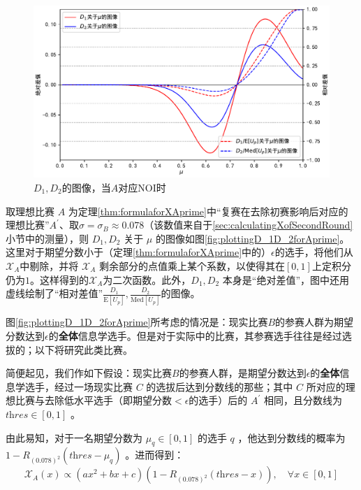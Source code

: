             \begin{figure}[htbp]
                \centering
                \includegraphics[width=\textwidth]{fig/plottingNoiD_1D_2.pdf}
                \caption{$D_1,D_2$的图像，当$A$对应NOI时}
                \label{fig:plottingD_1D_2forNoi}
            \end{figure}

            取理想比赛 $A$ 为定理\ref{thm:formulaforXAprime}中“复赛在去除初赛影响后对应的理想比赛”$A^\prime$、取$\sigma=\sigma_B\approx 0.078$（该数值来自于\ref{sec:calculatingXofSecondRound}小节中的测量），则 $D_1,D_2$ 关于 $\mu$ 的图像如图\ref{fig:plottingD_1D_2forAprime}。这里对于期望分数小于（定理\ref{thm:formulaforXAprime}中的）$\epsilon$的选手，将他们从$\mathcal{X}_A$中剔除，并将 $\mathcal{X}_A$ 剩余部分的点值乘上某个系数，以使得其在$[0,1]$上定积分仍为$1$。这样得到的$\mathcal{X}_A$为二次函数。此外，$D_1,D_2$ 本身是“绝对差值”，图中还用虚线绘制了“相对差值”$\frac{D_1}{\mathrm{E}\left[U_p\right]},\frac{D_2}{\mathrm{Med}\left[U_p\right]}$的图像。

            \vspace{1.5ex}

            图\ref{fig:plottingD_1D_2forAprime}所考虑的情况是：现实比赛$B$的参赛人群为期望分数达到$\epsilon$的\textbf{全体}信息学选手。但是对于实际中的比赛，其参赛选手往往是经过选拔的；以下将研究此类比赛。

            简便起见，我们作如下假设：现实比赛$B$的参赛人群，是期望分数达到$\epsilon$的\textbf{全体}信息学选手，经过一场现实比赛 $C$ 的选拔后达到分数线的那些；其中 $C$ 所对应的理想比赛与去除低水平选手（即期望分数$<\epsilon$的选手）后的 $A^\prime$ 相同，且分数线为 $\textit{thres}\in[0,1]$ 。

            由此易知，对于一名期望分数为 $\mu_q\in [0,1]$ 的选手 $q$ ，他达到分数线的概率为 $1-R_{(0.078)^2}(\textit{thres}-\mu_q)$ 。进而得到：
            $$
            \mathcal{X}_A(x)\propto (ax^2+bx+c)\left(1-R_{(0.078)^2}(\textit{thres}-x)\right),\quad\forall x\in [0,1]
            $$

